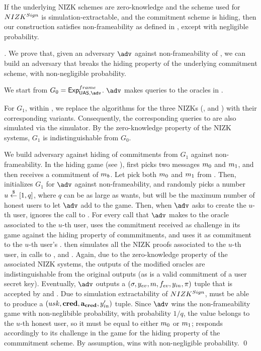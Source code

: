 \begin{theorem}
  \label{thm:frame-uas}
  If the underlying NIZK schemes are zero-knowledge and the scheme used for
  $NIZK^{Sign}$ is simulation-extractable, and the commitment scheme is
  hiding, then our \CUASGen construction satisfies non-frameability as defined
  in , except with negligible probability.
\end{theorem}

\begin{proof}[]
  We prove that, given an adversary $\adv$ against non-frameability of \CUASGen,
  we can build an adversary \advB that breaks the hiding property of the
  underlying commitment scheme, with non-negligible probability.

  We start from $G_0=\ExpNonframe$. $\adv$ makes queries to the oracles in
  \Oframe.

  For $G_1$, within \Setup, we replace the \Setup algorithms for the three
  NIZKs (\Issue, \Sign and \Inspect) with their corresponding \SimSetup
  variants. Consequently, the corresponding queries to \Prove are also
  simulated via the simulator. By the zero-knowledge property of the NIZK
  systems, $G_1$ is indistinguishable from $G_0$.
  
  We build adversary \advB against hiding of commitments from $G_1$ against
  non-frameability. In the hiding game (see ), \advB first
  picks two messages $m_0$ and $m_1$, and then receives a commitment \Ccom
  of $m_b$. Let \advB pick both $m_0$ and $m_1$ from \AttrSpace. Then,
  \advB initializes $G_1$ for $\adv$ against non-frameability, and randomly
  picks a number $u \stackrel{\$}{\gets} [1,q]$, where $q$ can be as large as \advB wants, but
  will be the maximum number of honest users to let $\adv$ add to the game.
  Then, when $\adv$ asks to create the $u$-th user, \advB ignores the call to
  \UKeyGen. For every call that $\adv$ makes to the \OBTAIN oracle associated to
  the $u$-th user, \advB uses the commitment \Ccom received as challenge in its
  game against the hiding property of commmitments, and uses it as commitment to
  the $u$-th user's \usk. \advB then simulates all the NIZK proofs associated to
  the $u$-th user, in calls to \OBTAIN, \SIGN and \INSPECT. Again, due to the
  zero-knowledge property of the associated NIZK systems, the outputs of the
  modified oracles are indistinguishable from the original outputs (as \Ccom
  is a valid commitment of a user secret key). Eventually, $\adv$ outputs a
  $(\sigma,y_{ev},m,f_{ev},y_{in},\pi)$ tuple that is accepted by \Verify
  and \Judge. Due to simulation extractability of $NIZK^{Sign}$, \ExtractSign
  must be able to produce a $(usk,\mathbf{cred},\mathbf{a}_{\mathbf{cred}},y_{in}')$ tuple. Since
  $\adv$ wins the
  non-frameability game with non-neglibible probability, with probability $1/q$,
  the \usk value belongs to the $u$-th honest user, so it must be equal to
  either $m_0$ or $m_1$; \advB responds accordingly to its challenge in
  the game for the hiding property of the commmitment scheme. By assumption,
  \advB wins with non-negligible probability.
  \qed
\end{proof}


